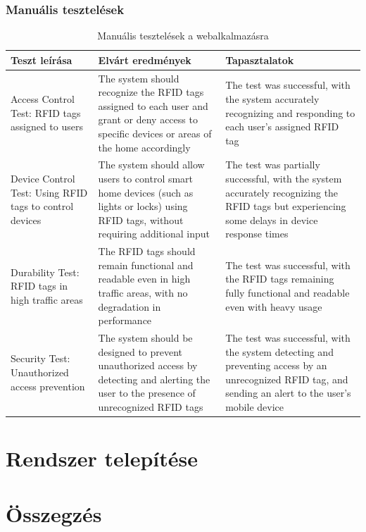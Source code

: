 \documentclass[
]{thesis-ekf}
\theoremstyle{definition}
\theoremstyle{remark}
\begin{document}
	\subsection{Manuális tesztelések}
	\begin{table}[ht!]
		\centering
		\begin{tabular}{|p{6cm}|p{6cm}|p{4cm}|}
			\hline
			\textbf{Teszt leírása} & \textbf{Elvárt eredmények} & \textbf{Tapasztalatok} \\
			\hline
			Access Control Test: RFID tags assigned to users &
			 The system should recognize the RFID tags assigned to each user and grant or deny access to specific devices or areas of the home accordingly &
			  The test was successful, with the system accurately recognizing and responding to each user's assigned RFID tag \\
			\hline
			Device Control Test: Using RFID tags to control devices &
			 The system should allow users to control smart home devices (such as lights or locks) using RFID tags, without requiring additional input &
			  The test was partially successful, with the system accurately recognizing the RFID tags but experiencing some delays in device response times \\
			\hline
			Durability Test: RFID tags in high traffic areas &
			 The RFID tags should remain functional and readable even in high traffic areas, with no degradation in performance &
			  The test was successful, with the RFID tags remaining fully functional and readable even with heavy usage \\
			\hline
			Security Test: Unauthorized access prevention &
			 The system should be designed to prevent unauthorized access by detecting and alerting the user to the presence of unrecognized RFID tags & 
			 The test was successful, with the system detecting and preventing access by an unrecognized RFID tag, and sending an alert to the user's mobile device \\
			\hline
		\end{tabular}
		\caption{Manuális tesztelések a webalkalmazásra}
		\label{table:manual-testing-results}
	\end{table}
	
	\chapter{Rendszer telepítése}

	
	\chapter*{Összegzés}
	
\end{document}
